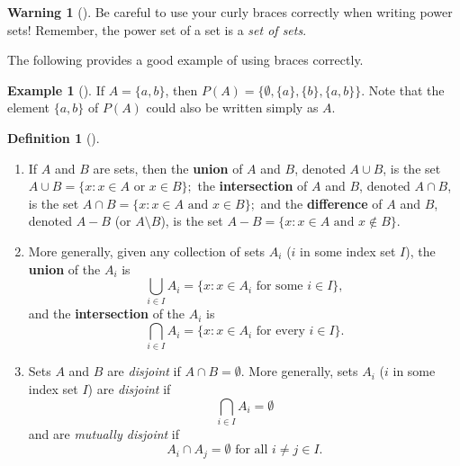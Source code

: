 \documentclass[10pt,]{book}
\newcommand{\terminology}[1]{\textbf{#1}}
\theoremstyle{plain}
\theoremstyle{definition}
\newtheorem{definition}[theorem]{Definition}
\theoremstyle{definition}
\newtheorem{warning}[theorem]{Warning}
\theoremstyle{definition}
\newtheorem{example}[theorem]{Example}
\theoremstyle{definition}
\numberwithin{equation}{section}
\begin{document}
\begin{warning}[]\label{warning-2}
Be careful to use your curly braces correctly when writing power sets! Remember, the power set of a set is a \emph{set of sets}.%
\end{warning}
The following provides a good example of using braces correctly.%
\begin{example}[]\label{example-3}
If \(A=\{a,b\}\), then \(P(A)=\{\emptyset, \{a\}, \{b\}, \{a,b\}\}\). Note that the element \(\{a,b\}\) of \(P(A)\) could also be written simply as \(A\).%
\end{example}
\begin{definition}[{}]\label{definition-6}
\leavevmode%
\begin{enumerate}
\item\hypertarget{li-6}{}If \(A\) and \(B\) are sets, then the \terminology{union} of \(A\) and \(B\), denoted \(A\cup B\), is the set \(A\cup B=\{x: x\in A \text{ or }  x\in B\};\) the \terminology{intersection} of \(A\) and \(B\), denoted \(A\cap B\), is the set \(A\cap B=\{x: x\in A \text{ and }  x\in B\};\) and the \terminology{difference} of \(A\) and \(B\), denoted \(A-B\) (or \(A\setminus B\)), is the set \(A-B=\{x: x\in A \text{ and }  x\not\in B\}.\)%
\item\hypertarget{li-7}{}More generally, given any collection of sets \(A_i\) (\(i\) in some index set \(I\)), the \terminology{union} of the \(A_i\) is%
\begin{equation*}
\bigcup_{i\in I}A_i=\{x: x\in A_i \text{ for some }  i\in I\},
\end{equation*}
and the \terminology{intersection} of the \(A_i\) is%
\begin{equation*}
\bigcap_{i\in I}A_i=\{x: x\in A_i \text{ for every }  i\in I\}.
\end{equation*}
%
\item\hypertarget{li-8}{}Sets \(A\) and \(B\) are \emph{disjoint} if \(A\cap B=\emptyset\).  More generally, sets \(A_i\) (\(i\) in some index set \(I\)) are \emph{disjoint} if%
\begin{equation*}
\bigcap_{i\in I}A_i=\emptyset
\end{equation*}
and are \emph{mutually disjoint} if%
\begin{equation*}
A_i\cap A_j=\emptyset \text{ for all } i\neq j \in I.
\end{equation*}
%
\end{enumerate}
\label{notation-17}
\label{notation-18}
\label{notation-19}
\label{notation-20}
\label{notation-21}
\end{definition}
\end{document}
